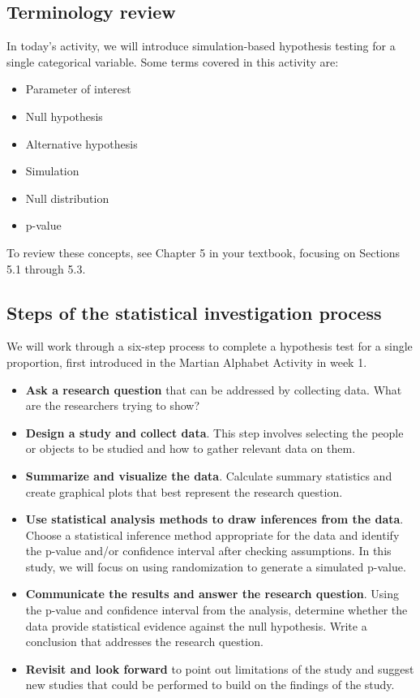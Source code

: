 \documentclass[
]{report}
\begin{document}
\hypertarget{terminology-review-11}{%
\subsection{Terminology review}\label{terminology-review-11}}

In today's activity, we will introduce simulation-based hypothesis testing for a single categorical variable. Some terms covered in this activity are:

\begin{itemize}
\item
  Parameter of interest
\item
  Null hypothesis
\item
  Alternative hypothesis
\item
  Simulation
\item
  Null distribution
\item
  p-value
\end{itemize}

To review these concepts, see Chapter 5 in your textbook, focusing on Sections 5.1 through 5.3.

\hypertarget{steps-of-the-statistical-investigation-process-1}{%
\subsection{Steps of the statistical investigation process}\label{steps-of-the-statistical-investigation-process-1}}

We will work through a six-step process to complete a hypothesis test for a single proportion, first introduced in the Martian Alphabet Activity in week 1.

\begin{itemize}
\item
  \textbf{Ask a research question} that can be addressed by collecting data. What are the researchers trying to show?
\item
  \textbf{Design a study and collect data}. This step involves selecting the people or objects to be studied and how to gather relevant data on them.
\item
  \textbf{Summarize and visualize the data}. Calculate summary statistics and create graphical plots that best represent the research question.
\item
  \textbf{Use statistical analysis methods to draw inferences from the data}. Choose a statistical inference method appropriate for the data and identify the p-value and/or confidence interval after checking assumptions. In this study, we will focus on using randomization to generate a simulated p-value.
\item
  \textbf{Communicate the results and answer the research question}. Using the p-value and confidence interval from the analysis, determine whether the data provide statistical evidence against the null hypothesis. Write a conclusion that addresses the research question.
\item
  \textbf{Revisit and look forward} to point out limitations of the study and suggest new studies that could be performed to build on the findings of the study.
\end{itemize}
\end{document}
